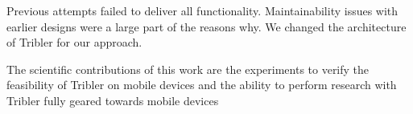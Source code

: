 Previous attempts failed to deliver all functionality. \cite{bsc_1,2,3}
Maintainability issues with earlier designs were a large part of the reasons why.
We changed the architecture of Tribler for our approach.

The scientific contributions of this work are the experiments to verify the feasibility of Tribler on mobile devices and the ability to perform research with Tribler fully geared towards mobile devices


